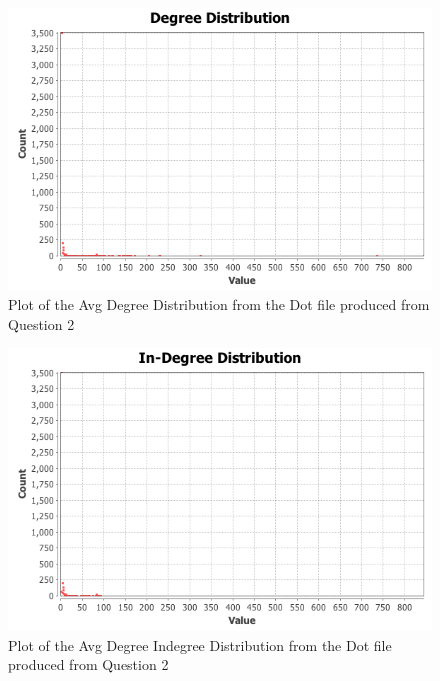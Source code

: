 \documentclass[letterpaper,11pt]{article}
\begin{document}
\begin{figure}[p]
\includegraphics[scale=0.5]{q3/Avg-Degree/degree-distribution.png}
\caption{Plot of the Avg Degree Distribution from the Dot file produced from Question 2}
\label{fig:q3avgdegree-distribution}
\end{figure}

\begin{figure}[p]
\includegraphics[scale=0.5]{q3/Avg-Degree/indegree-distribution.png}
\caption{Plot of the Avg Degree Indegree Distribution from the Dot file produced from Question 2}
\label{fig:q3avgdegree-indegree-distribution}
\end{figure}
\end{document}
